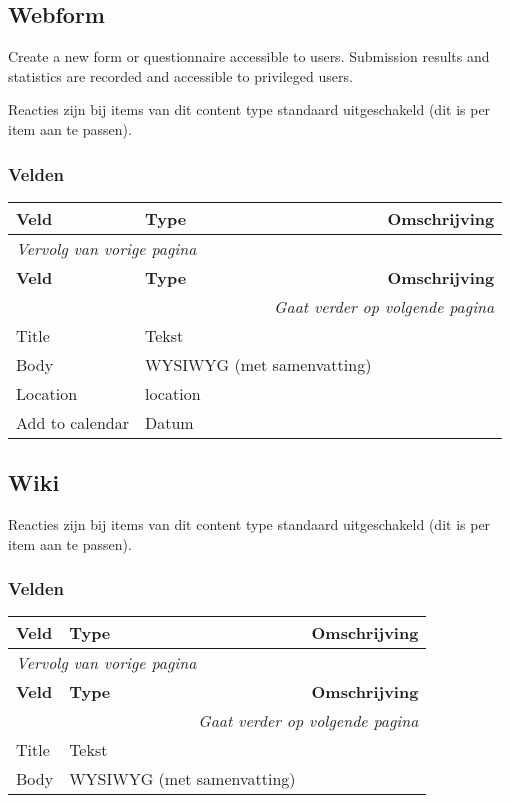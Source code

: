 \subsection{Webform}
\label{sec:content-webform}
Create a new form or questionnaire accessible to users. Submission results and statistics are recorded and accessible to privileged users.

Reacties zijn bij items van dit content type standaard uitgeschakeld (dit is per item aan te passen).

\subsubsection{Velden}
  \begin{longtable}{| p{3.75cm}|p{3.75cm}|p{7.50cm}|}
  \hline
  \rowcolor{tableheader}
  \textbf{Veld} & \textbf{Type} & \textbf{Omschrijving}  \tabularnewline
  \hline
\endfirsthead
\multicolumn{3}{l}{\textit{Vervolg van vorige pagina}} \\
\hline
\rowcolor{tableheader}
  \textbf{Veld} & \textbf{Type} & \textbf{Omschrijving}  \tabularnewline
  \hline
\hline
\endhead
\multicolumn{3}{r}{\textit{Gaat verder op volgende pagina}} \\
\endfoot
\hline
\endlastfoot
  \raggedright{Title} & \raggedright{Tekst} & \raggedright{}  \tabularnewline
  \hline
  \raggedright{Body} & \raggedright{WYSIWYG (met samenvatting)} & \raggedright{}  \tabularnewline
  \hline
  \raggedright{Location} & \raggedright{location} & \raggedright{}  \tabularnewline
  \hline
  \raggedright{Add to calendar} & \raggedright{Datum} & \raggedright{}  \tabularnewline
  \hline
  \end{longtable}

\subsection{Wiki}
\label{sec:content-wiki}
Reacties zijn bij items van dit content type standaard uitgeschakeld (dit is per item aan te passen).

\subsubsection{Velden}
  \begin{longtable}{| p{3.75cm}|p{3.75cm}|p{7.50cm}|}
  \hline
  \rowcolor{tableheader}
  \textbf{Veld} & \textbf{Type} & \textbf{Omschrijving}  \tabularnewline
  \hline
\endfirsthead
\multicolumn{3}{l}{\textit{Vervolg van vorige pagina}} \\
\hline
\rowcolor{tableheader}
  \textbf{Veld} & \textbf{Type} & \textbf{Omschrijving}  \tabularnewline
  \hline
\hline
\endhead
\multicolumn{3}{r}{\textit{Gaat verder op volgende pagina}} \\
\endfoot
\hline
\endlastfoot
  \raggedright{Title} & \raggedright{Tekst} & \raggedright{}  \tabularnewline
  \hline
  \raggedright{Body} & \raggedright{WYSIWYG (met samenvatting)} & \raggedright{}  \tabularnewline
  \hline
  \end{longtable}
